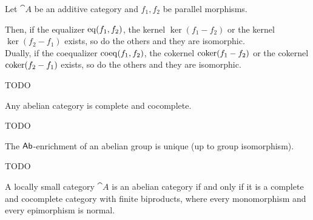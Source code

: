	\begin{proposition}
		Let $\cat{A}$ be an additive category and $f_1,f_2$ be parallel morphisms.

		Then, if the equalizer $\operatorname{eq}(f_1,f_2)$, the kernel $\ker(f_1-f_2)$ or the kernel $\ker(f_2-f_1)$ exists, so do the others and they are isomorphic.\\
		Dually, if the coequalizer $\operatorname{coeq}(f_1,f_2)$, the cokernel $\operatorname{coker}(f_1-f_2)$ or the cokernel $\operatorname{coker}(f_2-f_1)$ exists, so do the others and they are isomorphic.
	\end{proposition}
	\begin{sketch}
		TODO
	\end{sketch}

	\begin{corollary}
		Any abelian category is complete and cocomplete.
	\end{corollary}
	\begin{sketch}
		TODO
	\end{sketch}

	\begin{theorem}
		The $\textsf{Ab}$-enrichment of an abelian group is unique (up to group isomorphism).
	\end{theorem}
	\begin{sketch}
		TODO
	\end{sketch}

	\begin{corollary}
		A locally small category $\cat{A}$ is an abelian category if and only if it is a complete and cocomplete category with finite biproducts, where every monomorphism and every epimorphism is normal.
	\end{corollary}

